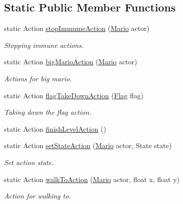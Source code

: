 \subsection*{Static Public Member Functions}
\begin{DoxyCompactItemize}
\item 
static Action \hyperlink{classnl_1_1arjanfrans_1_1mario_1_1actions_1_1MarioActions_ad04abb15058ffa3c3baf3a2301f4cf8c}{stop\+Immume\+Action} (\hyperlink{classnl_1_1arjanfrans_1_1mario_1_1model_1_1Mario}{Mario} actor)
\begin{DoxyCompactList}\small\item\em Stopping immune actions. \end{DoxyCompactList}\item 
static Action \hyperlink{classnl_1_1arjanfrans_1_1mario_1_1actions_1_1MarioActions_a0972a48677ce5de654513b88f8df56f1}{big\+Mario\+Action} (\hyperlink{classnl_1_1arjanfrans_1_1mario_1_1model_1_1Mario}{Mario} actor)
\begin{DoxyCompactList}\small\item\em Actions for big mario. \end{DoxyCompactList}\item 
static Action \hyperlink{classnl_1_1arjanfrans_1_1mario_1_1actions_1_1MarioActions_a4bfff41cf72d50a375c8546e05a0dfe9}{flag\+Take\+Down\+Action} (\hyperlink{classnl_1_1arjanfrans_1_1mario_1_1model_1_1Flag}{Flag} flag)
\begin{DoxyCompactList}\small\item\em Taking down the flag action. \end{DoxyCompactList}\item 
static Action \hyperlink{classnl_1_1arjanfrans_1_1mario_1_1actions_1_1MarioActions_a13ae9ce9afa4beb76cf7a74ec7167099}{finish\+Level\+Action} ()
\item 
static Action \hyperlink{classnl_1_1arjanfrans_1_1mario_1_1actions_1_1MarioActions_a908d016fe41950d737a578f8bb5e8122}{set\+State\+Action} (\hyperlink{classnl_1_1arjanfrans_1_1mario_1_1model_1_1Mario}{Mario} actor, State state)
\begin{DoxyCompactList}\small\item\em Set action state. \end{DoxyCompactList}\item 
static Action \hyperlink{classnl_1_1arjanfrans_1_1mario_1_1actions_1_1MarioActions_a68e2909268b910bb8568c9ca0730382f}{walk\+To\+Action} (\hyperlink{classnl_1_1arjanfrans_1_1mario_1_1model_1_1Mario}{Mario} actor, float x, float y)
\begin{DoxyCompactList}\small\item\em Action for walking to. \end{DoxyCompactList}\end{DoxyCompactItemize}


